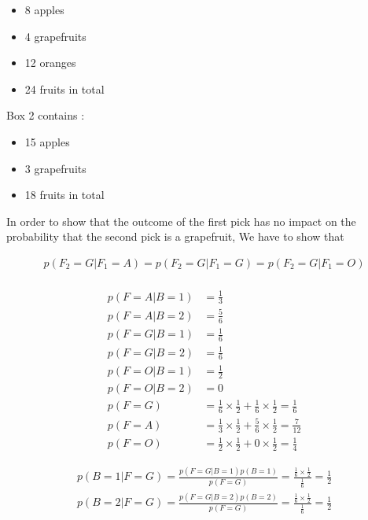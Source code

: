 \documentclass[a4paper]{article}
\begin{document}
\begin{itemize}
	\item 8 apples
	\item 4 grapefruits
	\item 12 oranges
	\item 24 fruits in total
\end{itemize}

Box 2 contains :

\begin{itemize}
	\item 15 apples
	\item 3 grapefruits
	\item 18 fruits in total
\end{itemize}

In order to show that the outcome of the first pick has no impact on the probability that the second pick is a grapefruit, We have to show that

\begin{align*}
	p(F_2 = G | F_1 = A) = p(F_2 = G | F_1 = G) = p(F_2 = G | F_1 = O)\\
\end{align*}

\begin{align*}
	p(F = A | B = 1) &= \frac{1}{3}\\
	p(F = A | B = 2) &= \frac{5}{6}\\
	p(F = G | B = 1) &= \frac{1}{6}\\
	p(F = G | B = 2) &= \frac{1}{6}\\
	p(F = O | B = 1) &=  \frac{1}{2}\\
	p(F = O | B = 2) &=  0\\
	p(F = G) &= \frac{1}{6} \times \frac{1}{2} + \frac{1}{6} \times \frac{1}{2} = \frac{1}{6}\\
	p(F = A) &= \frac{1}{3} \times  \frac{1}{2} + \frac{5}{6} \times \frac{1}{2} = \frac{7}{12}\\
	p(F = O) &= \frac{1}{2} \times \frac{1}{2} + 0 \times \frac{1}{2} =  \frac{1}{4}
\end{align*}

\begin{align*}
	p(B = 1 | F = G) = \frac{p(F = G | B = 1)p(B = 1)}{p(F = G)} = \frac{\frac{1}{6} \times \frac{1}{2}}{\frac{1}{6}} = \frac{1}{2}\\
	p(B = 2 | F = G) = \frac{p(F = G | B = 2)p(B = 2)}{p(F = G)} = \frac{\frac{1}{6} \times \frac{1}{2}}{\frac{1}{6}} = \frac{1}{2}
\end{align*}
\end{document}
